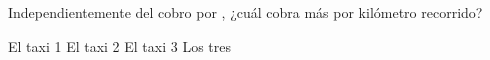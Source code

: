 Independientemente del cobro por , ¿cuál cobra más por kilómetro recorrido?

\begin{oneparchoices}
    \choice El taxi 1
    \CorrectChoice El taxi 2
    \choice El taxi 3
    \choice Los tres
\end{oneparchoices}
